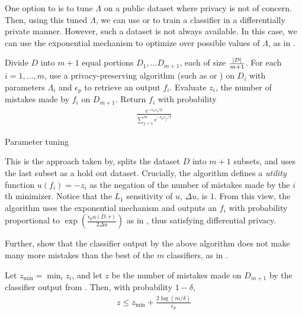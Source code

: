 \documentclass{article} %
\begin{document}
One option to is to tune $\Lambda$ on a public dataset where privacy is not of
concern. Then, using this tuned $\Lambda$, we can use 
or  to train a classifier in a differentially private
manner. However, such a dataset is not always available. In this case, we can
use the exponential mechanism to optimize over possible values of $\Lambda$, as
in .

\begin{algorithm}[htb]
\begin{algorithmic}[1]
    \State Divide $D$ into $m + 1$ equal portions $D_1, \dots D_{m+1}$, each of
           size $\tfrac{\left\lvert D\right\rvert}{m + 1}$.
    \State For each $i = 1, \dots, m$, use a privacy-preserving algorithm
           (such as  or ) on
           $D_i$ with parameters $\Lambda_i$ and $\epsilon_p$ to retrieve an
           output $f_i$.
    \State Evaluate $z_i$, the number of mistakes made by $f_i$ on $D_{m+1}$.
    \State Return $f_i$ with probability
           \begin{align*}
           \frac{e^{-\epsilon_p z_i / 2}}{\sum_{j=1}^m e^{-\epsilon_p z_j / 2}}
           \end{align*}
   \EndFunction
\end{algorithmic}
\caption{Parameter tuning}\label{alg:parameter_tuning}
\end{algorithm}

This is the approach taken by, splits the dataset $D$
into $m+1$ subsets, and uses the last subset as a hold out dataset. Crucially,
the algorithm defines a \textit{utility} function $u(f_i) = -z_i$ as the
negation of the number of mistakes made by the $i$th minimizer. Notice that the
$L_1$ sensitivity of $u$, $\Delta u$, is $1$.  From this view, the algorithm
uses the exponential mechanism and outputs an $f_i$ with probability
proportional to $\exp(\tfrac{\epsilon_p u(D, r)}{2 \Delta u})$ as in
, thus satisfying differential privacy.

Further, \cite{chaudhuri2011erm} show that the classifier output by
the above algorithm does not make many more mistakes than the best of the $m$
classifiers, as in .

\begin{theorem}
Let $z_{\text{min}} = \min_i z_i$, and let $z$ be the number of mistakes made on
$D_{m+1}$ by the classifier output from . Then, with
probability $1 - \delta$,
\begin{align*}
z \leq z_{\text{min}} + \frac{2 \log(m/\delta)}{\epsilon_p}
\end{align*}
\label{thm:parameter_tuning}
\end{theorem}
\end{document}
